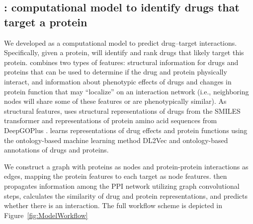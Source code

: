 \documentclass{bioinfo}
\renewcommand{\cite}{\citep}
\begin{document}
\subsection{\name{}: computational model to identify drugs that target a
  protein}


We developed \name{} as a computational model to predict drug--target
interactions. Specifically, given a protein, \name{} will identify and
rank drugs that likely target this protein. \name{} combines two types
of features: structural information for drugs and proteins that can be
used to determine if the drug and protein physically interact, and
information about phenotypic effects of drugs and changes in protein
function that may ``localize'' on an interaction network (i.e.,
neighboring nodes will share some of these features or are
phenotypically similar). As structural features, \name{} uses
structural representations of drugs from the SMILES transformer
\cite{SmilesTransformer} and representations of protein amino acid
sequences from DeepGOPlus \cite{DeepGoPlus}.  \name{} learns
representations of drug effects and protein functions using the
ontology-based machine learning method DL2Vec \cite{DL2vec2020} and
ontology-based annotations of drugs and proteins.

We construct a graph with proteins as nodes and protein-protein
interactions as edges, mapping the protein features to each target as
node features. \name{} then propagates information among the PPI
network utilizing graph convolutional steps, calculates the similarity
of drug and protein representations, and predicts whether there is an
interaction. The full workflow scheme is depicted in
Figure~\ref{fig:ModelWorkflow}

\end{document}
